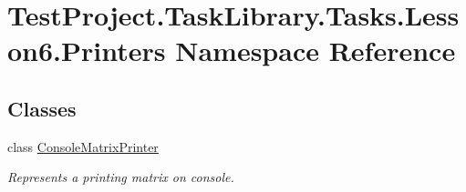 \hypertarget{namespace_test_project_1_1_task_library_1_1_tasks_1_1_lesson6_1_1_printers}{}\section{Test\+Project.\+Task\+Library.\+Tasks.\+Lesson6.\+Printers Namespace Reference}
\label{namespace_test_project_1_1_task_library_1_1_tasks_1_1_lesson6_1_1_printers}
\subsection*{Classes}
\begin{DoxyCompactItemize}
\item 
class \mbox{\hyperlink{class_test_project_1_1_task_library_1_1_tasks_1_1_lesson6_1_1_printers_1_1_console_matrix_printer}{Console\+Matrix\+Printer}}
\begin{DoxyCompactList}\small\item\em Represents a printing matrix on console. \end{DoxyCompactList}\end{DoxyCompactItemize}
